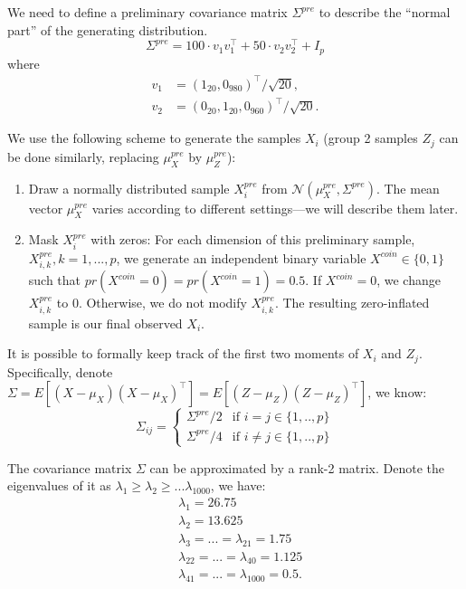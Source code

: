 \documentclass[11pt]{article}
\begin{document}
We need to define a preliminary covariance matrix $\Sigma^{pre}$ to describe the ``normal part'' of the generating distribution. 
$$
    \Sigma^{pre} = 100\cdot v_1v_1^\top + 50\cdot v_2v_2^\top + I_p
$$
where
\begin{equation}
\label{eq: zero inflated eigenvector}
    \begin{aligned}
        v_1 & = (1_{20}, 0_{980})^\top/\sqrt{20},\\
        v_2 & = (0_{20}, 1_{20}, 0_{960})^\top/\sqrt{20}.
    \end{aligned}
\end{equation}

We use the following scheme to generate the samples $X_i$ (group 2 samples $Z_j$ can be done similarly, replacing $\mu_X^{pre}$ by $\mu_Z^{pre}$):
\begin{enumerate}
    \item Draw a normally distributed sample $X_i^{pre}$ from $\mathcal N(\mu_X^{pre}, \Sigma^{pre})$. The mean vector $\mu_X^{pre}$ varies according to different settings---we will describe them later.
    \item Mask $X_i^{pre}$ with zeros: For each dimension of this preliminary sample, $X_{i,k}^{pre}, k = 1,...,p$, we generate an independent binary variable $X^{coin}\in\{0,1\}$ such that $pr(X^{coin} = 0) = pr(X^{coin} = 1) = 0.5$. If $X^{coin} = 0$, we change $X_{i,k}^{pre}$ to $0$. Otherwise, we do not modify $X_{i,k}^{pre}$. The resulting zero-inflated sample is our final observed $X_i$.
\end{enumerate}

It is possible to formally keep track of the first two moments of $X_i$ and $Z_j$. Specifically, denote $\Sigma = E[(X - \mu_X)(X - \mu_X)^\top] = E[(Z - \mu_Z)(Z - \mu_Z)^\top]$, we know:
$$
     \Sigma_{ij} = \begin{cases}
\Sigma^{pre}/2 & \text{if } i = j \in\{1,..,p\} \\
\Sigma^{pre}/4 & \text{if } i \neq j \in\{1,..,p\}
\end{cases}
$$

The covariance matrix $\Sigma$ can be approximated by a rank-2 matrix. Denote the eigenvalues of it as $\lambda_1 \geq \lambda_2 \geq ...\lambda_{1000}$, we have:
\begin{equation*}
\begin{aligned}
    &\lambda_1 = 26.75\\
    &\lambda_2 = 13.625\\
    &\lambda_3 = ...=\lambda_{21} = 1.75\\
    &\lambda_{22} = ... = \lambda_{40} = 1.125\\
    &\lambda_{41} = ... = \lambda_{1000} = 0.5.
\end{aligned}
\end{equation*}
\end{document}
